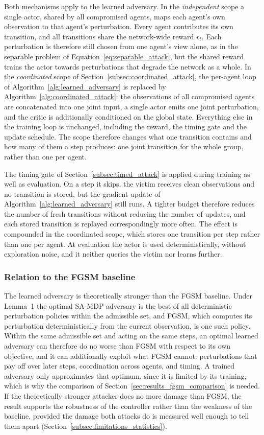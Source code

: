 Both mechanisms apply to the learned adversary. In the \emph{independent} scope a single
actor, shared by all compromised agents, maps each agent's own observation to that
agent's perturbation. Every agent contributes its own transition, and all transitions
share the network-wide reward $r_t$. Each perturbation is therefore still chosen from one
agent's view alone, as in the separable problem of
Equation~\eqref{eq:separable_attack}, but the shared reward trains the actor towards
perturbations that degrade the network as a whole. In the \emph{coordinated} scope of
Section~\ref{subsec:coordinated_attack}, the per-agent loop of
Algorithm~\ref{alg:learned_adversary} is replaced by
Algorithm~\ref{alg:coordinated_attack}: the observations of all compromised agents are
concatenated into one joint input, a single actor emits one joint perturbation, and the
critic is additionally conditioned on the global state. Everything else in the training
loop is unchanged, including the reward, the timing gate and the update schedule. The
scope therefore changes what one transition contains and how many of them a step
produces: one joint transition for the whole group, rather than one per agent.

The timing gate of Section~\ref{subsec:timed_attack} is applied during training as well
as evaluation. On a step it skips, the victim receives clean observations and no
transition is stored, but the gradient update of Algorithm~\ref{alg:learned_adversary}
still runs. A tighter budget therefore reduces the number of fresh transitions without
reducing the number of updates, and each stored transition is replayed correspondingly
more often. The effect is compounded in the coordinated scope, which stores one
transition per step rather than one per agent. At evaluation the actor is used
deterministically, without exploration noise, and it neither queries the victim nor
learns further.

\subsubsection*{Relation to the FGSM baseline}

The learned adversary is theoretically stronger than the FGSM baseline. Under Lemma~1
the optimal SA-MDP adversary is the best of all deterministic perturbation policies
within the admissible set, and FGSM, which computes its perturbation deterministically
from the current observation, is one such policy. Within the same admissible set and
acting on the same steps, an optimal learned adversary can therefore do no worse than
FGSM with respect to its own objective, and it can additionally exploit what FGSM
cannot: perturbations that pay off over later steps, coordination across agents, and
timing. A trained adversary only approximates that optimum, since it is limited by its
training, which is why the comparison of Section~\ref{sec:results_fgsm_comparison} is
needed. If the theoretically stronger attacker does no more damage than FGSM, the
result supports the robustness of the controller rather than the weakness of the
baseline, provided the damage both attacks do is measured well enough to tell them
apart (Section~\ref{subsec:limitations_statistics}).

